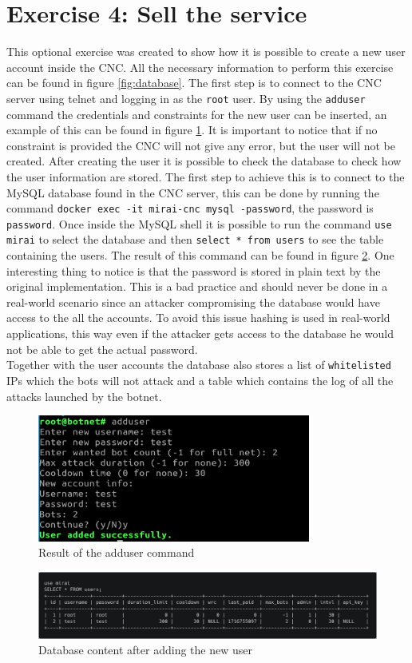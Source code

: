 \section{Exercise 4: Sell the service}
This optional exercise was created to show how it is possible to create a new user account inside the CNC. All the necessary information to perform this exercise can be found in figure \ref{fig:database}. The first step is to connect to the CNC server using telnet and logging in as the \texttt{root} user. By using the \texttt{adduser} command the credentials and constraints for the new user can be inserted, an example of this can be found in figure \ref{fig:add_user}. It is important to notice that if no constraint is provided the CNC will not give any error, but the user will not be created. After creating the user it is possible to check the database to check how the user information are stored. The first step to achieve this is to connect to the MySQL database found in the CNC server, this can be done by running the command \texttt{docker exec -it mirai-cnc mysql -password}, the password is \texttt{password}. Once inside the MySQL shell it is possible to run the command \texttt{use mirai} to select the database and then \texttt{select * from users} to see the table containing the users. The result of this command can be found in figure \ref{fig:table_users}. One interesting thing to notice is that the password is stored in plain text by the original implementation. This is a bad practice and should never be done in a real-world scenario since an attacker compromising the database would have access to the all the accounts. To avoid this issue hashing is used in real-world applications, this way even if the attacker gets access to the database he would not be able to get the actual password. \\
Together with the user accounts the database also stores a list of \texttt{whitelisted} IPs which the bots will not attack and a table which contains the log of all the attacks launched by the botnet.

\begin{figure}
    \centering
    \includegraphics[width=0.8\textwidth]{resources/images/add_user.png}
    \caption{Result of the adduser command}
    \label{fig:add_user}
\end{figure}

\begin{figure}
    \centering
    \includegraphics[width=1.0\textwidth]{resources/images/table_users.png}
    \caption{Database content after adding the new user}
    \label{fig:table_users}
\end{figure}